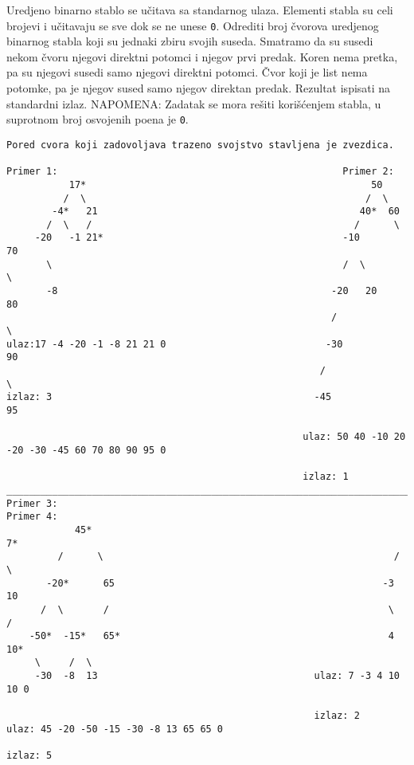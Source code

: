 \begin{z}
Uredjeno binarno stablo se u\v citava sa standarnog ulaza. Elementi stabla su celi brojevi
i u\v citavaju se sve dok se ne unese {\tt 0}.
Odrediti broj \v cvorova uredjenog binarnog stabla
koji su jednaki zbiru svojih suseda. Smatramo da su susedi nekom \v cvoru njegovi direktni potomci i njegov prvi predak.
Koren nema pretka, pa su njegovi susedi samo njegovi direktni potomci. \v Cvor koji je list nema potomke, pa je njegov sused samo njegov direktan predak. Rezultat ispisati na standardni izlaz.
NAPOMENA: Zadatak se mora re\v siti kori\v s\'cenjem stabla, u suprotnom broj osvojenih poena je {\tt 0}.
\end{z}

\begin{verbatim}
Pored cvora koji zadovoljava trazeno svojstvo stavljena je zvezdica.

Primer 1:                                                  Primer 2:
           17*                                                  50
          /  \                                                 /  \
        -4*   21                                              40*  60
       /  \   /                                              /      \
     -20   -1 21*                                          -10       70
       \                                                   /  \       \
       -8                                                -20   20      80
                                                         /              \
ulaz:17 -4 -20 -1 -8 21 21 0                            -30             90
                                                       /                  \
izlaz: 3                                              -45                 95

                                                    ulaz: 50 40 -10 20 -20 -30 -45 60 70 80 90 95 0

                                                    izlaz: 1
________________________________________________________________________________________________
Primer 3:                                                        Primer 4:
            45*                                                        7*
         /      \                                                   /   \
       -20*      65                                               -3     10
      /  \       /                                                 \     /
    -50*  -15*   65*                                               4    10*
     \     /  \
     -30  -8  13                                      ulaz: 7 -3 4 10 10 0

                                                      izlaz: 2
ulaz: 45 -20 -50 -15 -30 -8 13 65 65 0

izlaz: 5
\end{verbatim}


